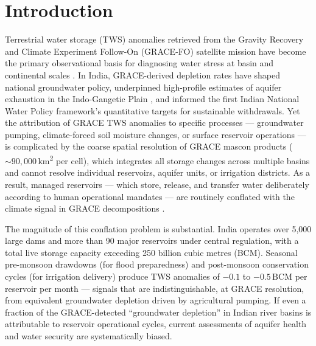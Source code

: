 \documentclass[preprint,12pt,authoryear]{elsarticle}
\newcommand{\BCM}{\,\mathrm{BCM}}
\begin{document}
\section{Introduction}
\label{sec:intro}

Terrestrial water storage (TWS) anomalies retrieved from the Gravity Recovery
and Climate Experiment Follow-On (GRACE-FO) satellite mission have become the
primary observational basis for diagnosing water stress at basin and
continental scales \citep{Tapley2019}. In India, GRACE-derived depletion rates
have shaped national groundwater policy, underpinned high-profile estimates of
aquifer exhaustion in the Indo-Gangetic Plain \citep{Rodell2009}, and informed
the first Indian National Water Policy framework's quantitative targets for
sustainable withdrawals. Yet the attribution of GRACE TWS anomalies to
specific processes --- groundwater pumping, climate-forced soil moisture
changes, or surface reservoir operations --- is complicated by the coarse
spatial resolution of GRACE mascon products
($\sim 90{,}000$\,\si{\square\kilo\metre} per cell), which integrates all
storage changes across multiple basins and cannot resolve individual
reservoirs, aquifer units, or irrigation districts. As a result, managed
reservoirs --- which store, release, and transfer water deliberately according
to human operational mandates --- are routinely conflated with the climate
signal in GRACE decompositions \citep{Wada2017}.

The magnitude of this conflation problem is substantial. India operates over
5,000 large dams and more than 90 major reservoirs under central regulation,
with a total live storage capacity exceeding 250 billion cubic metres (BCM).
Seasonal pre-monsoon drawdowns (for flood preparedness) and post-monsoon
conservation cycles (for irrigation delivery) produce TWS anomalies of
$-0.1$ to $-0.5\BCM$ per reservoir per month --- signals that are
indistinguishable, at GRACE resolution, from equivalent groundwater depletion
driven by agricultural pumping. If even a fraction of the GRACE-detected
``groundwater depletion'' in Indian river basins is attributable to reservoir
operational cycles, current assessments of aquifer health and water security
are systematically biased.
\end{document}
